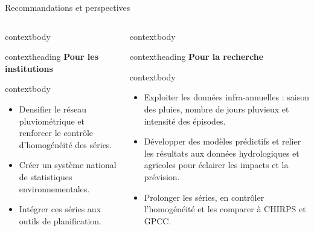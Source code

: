 \documentclass[aspectratio=169,11pt]{beamer}
\begin{document}
\begin{frame}{Recommandations et perspectives}
  \vspace{0.38cm}
  \begin{columns}[T,onlytextwidth]
      \begin{beamercolorbox}[wd=\linewidth,rounded=true,sep=0pt]{contextbody}
        \begin{beamercolorbox}[wd=\linewidth,ht=0.42cm,dp=0.10cm,leftskip=0.16cm]{contextheading}
          \bfseries Pour les institutions
        \end{beamercolorbox}
        \par\vspace{0.08cm}
        \begin{beamercolorbox}[wd=\linewidth,sep=0.12cm]{contextbody}
          \small
          \begin{itemize}
            \setlength\itemsep{0.16cm}
            \item \textcolor{marine}{Densifier le réseau pluviométrique} et renforcer le contrôle d’homogénéité des séries.
            \item Créer un système national de statistiques environnementales.
            \item Intégrer ces séries aux outils de planification.
          \end{itemize}
        \end{beamercolorbox}
      \end{beamercolorbox}
      \begin{beamercolorbox}[wd=\linewidth,rounded=true,sep=0pt]{contextbody}
        \begin{beamercolorbox}[wd=\linewidth,ht=0.42cm,dp=0.10cm,leftskip=0.16cm]{contextheading}
          \bfseries Pour la recherche
        \end{beamercolorbox}
        \par\vspace{0.08cm}
        \begin{beamercolorbox}[wd=\linewidth,sep=0.12cm]{contextbody}
          \small
          \begin{itemize}
            \setlength\itemsep{0.12cm}
            \item Exploiter les données \textcolor{marine}{infra-annuelles} : saison des pluies, nombre de jours pluvieux et intensité des épisodes.
            \item Développer des modèles prédictifs et relier les résultats aux données hydrologiques et agricoles pour éclairer les impacts et la prévision.
            \item Prolonger les séries, en contrôler l’homogénéité et les comparer à CHIRPS et GPCC.
          \end{itemize}
        \end{beamercolorbox}
      \end{beamercolorbox}
  \end{columns}
\end{frame}
\end{document}

